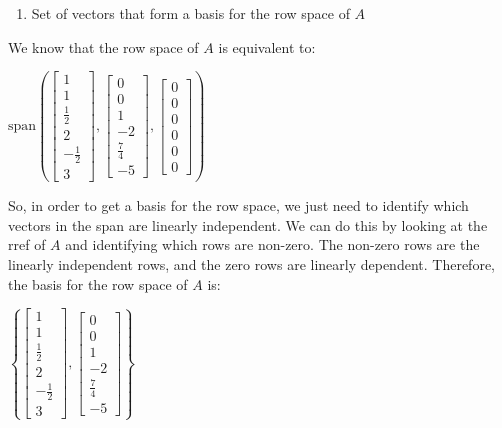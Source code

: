 \documentclass[
  letterpaper,
  DIV=11,
  numbers=noendperiod]{scrartcl}
\providecommand{\tightlist}{%
  \setlength{\itemsep}{0pt}\setlength{\parskip}{0pt}}\usepackage{longtable,booktabs,array}
\begin{document}
\newpage{}

\begin{enumerate}
\def\labelenumi{\alph{enumi}.}
\setcounter{enumi}{1}
\tightlist
\item
  Set of vectors that form a basis for the row space of \(A\)
\end{enumerate}

We know that the row space of \(A\) is equivalent to:

\(\mathrm{span}\left(\begin{bmatrix}1 \\ 1 \\ \frac{1}{2} \\ 2 \\ -\frac{1}{2} \\ 3\end{bmatrix},\begin{bmatrix}0 \\ 0 \\ 1 \\ -2 \\ \frac{7}{4} \\ -5\end{bmatrix},\begin{bmatrix}0 \\ 0 \\ 0 \\ 0 \\ 0 \\ 0\end{bmatrix} \right)\)

So, in order to get a basis for the row space, we just need to identify
which vectors in the span are linearly independent. We can do this by
looking at the rref of \(A\) and identifying which rows are non-zero.
The non-zero rows are the linearly independent rows, and the zero rows
are linearly dependent. Therefore, the basis for the row space of \(A\)
is:

\(\left\{\begin{bmatrix}1 \\ 1 \\ \frac{1}{2} \\ 2 \\ -\frac{1}{2} \\ 3\end{bmatrix},\begin{bmatrix}0 \\ 0 \\ 1 \\ -2 \\ \frac{7}{4} \\ -5\end{bmatrix}\right\}\)
\end{document}
